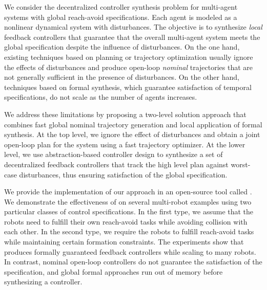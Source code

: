 
We consider the decentralized controller synthesis problem for multi-agent systems with global reach-avoid specifications.
Each agent is modeled as a nonlinear dynamical system with disturbances. 
The objective is to synthesize \emph{local} feedback controllers that 
guarantee that the overall multi-agent system meets the global specification despite the influence of disturbances.
%
On the one hand, existing techniques based on planning or trajectory optimization usually ignore the effects of disturbances and produce open-loop
\emph{nominal} trajectories that are not generally sufficient in the presence of disturbances.
On the other hand, techniques based on formal synthesis, which guarantee satisfaction of temporal specifications, 
do not scale as the number of agents increases.

We address these limitations by proposing a two-level solution approach that combines fast global nominal trajectory 
generation and local application of formal synthesis.
At the top level, we ignore the effect of disturbances and obtain a joint open-loop plan for the system using a fast trajectory optimizer.
At the lower level, we use abstraction-based controller design to synthesize a set of decentralized feedback controllers 
that track the high level plan against worst-case disturbances, thus ensuring satisfaction of the global specification.

We provide the implementation of our approach in an open-source tool called \tool.
We demonstrate the effectiveness of \tool on several multi-robot examples using two particular classes of control specifications.
In the first type, we assume that the robots need to fulfill their own reach-avoid tasks while avoiding collision with each other.
In the second type, we require the robots to fulfill reach-avoid tasks while maintaining certain formation constraints.
The experiments show that \tool produces formally guaranteed feedback controllers while scaling to many robots.
In contrast, nominal open-loop controllers do not guarantee the satisfaction of the specification, and 
global formal approaches run out of memory before synthesizing a controller.

